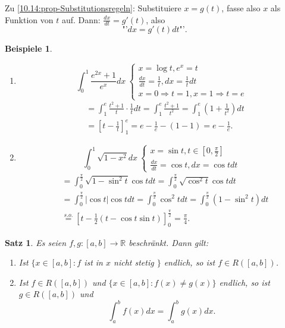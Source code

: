 \documentclass[12pt]{extreport} %
\newcommand{\R}{\mathbb{R}}
\theoremstyle{named}
\theoremstyle{itshape}
\newtheorem{satz}[unnamedtheorem]{Satz}
\theoremstyle{normal}
\newtheorem*{beispiele}{Beispiele}
\begin{document}
{Zu \ref{10.14:prop-Substitutionsregeln}: Substituiere $x = g(t)$, fasse also $x$ als Funktion von $t$ auf. Dann: $\frac{dx}{dt} = g'(t)$, also
	$$ \text{"'} dx = g'(t) dt \text{"'}. $$


\begin{beispiele} ~\
	\begin{enumerate}
		\item $$\int_{0}^{1} \frac{e^{2x} + 1}{e^{x}} dx ~ \begin{cases} x = \log t, e^{x} = t \\ \frac{dx}{dt} = \frac{1}{t}, dx = \frac{1}{t} dt \\ 
		x = 0 \Rightarrow t = 1, x = 1 \Rightarrow t = e \end{cases} $$
			\begin{align*}
				& = \int_{1}^{e} \frac{t^{2} + 1}{t} \cdot \frac{1}{t} dt = \int_{1}^{e} \frac{t^{2} + 1}{t^{2}} = \int_{1}^{e} (1 + \frac{1}{t^{2}}) dt \\
				& = \left[ t - \frac{1}{t} \right]_{1}^{e} = e - \frac{1}{e} - (1 - 1) = e - \frac{
				1}{e}.
			\end{align*}
		\item $$\int_{0}^{1} \sqrt{1 - x^{2}} dx ~ \begin{cases} x = \sin t, t \in [0, \frac{\pi}{2}] \\ \frac{dx}{dt} = \cos t, dx = \cos t dt \end{cases}$$
			\begin{align*}
				& = \int_{0}^{\frac{\pi}{2}} \sqrt{1 - \sin^{2}t} \cos t dt = \int_{0}^{\frac{\pi}{2}} \sqrt{\cos^{2} t} \cos t dt \\
				& = \int_{0}^{\frac{\pi}{2}} |\cos t| \cos t dt = \int_{0}^{\frac{\pi}{2}} \cos^{2} t dt = \int_{0}^{\frac{\pi}{2}} (1 - \sin^{2} t) dt \\
				& \overset{s.o.}{=} \left[ t - \frac{1}{2} (t - \cos t \sin t) \right]_{0}^{\frac{\pi}{2}} = \frac{\pi}{4}.
			\end{align*}
	\end{enumerate}
\end{beispiele}



\begin{satz} \label{10.15:satz}
	Es seien $f, g \colon [a, b] \rightarrow \R$ beschränkt. Dann gilt:
	\begin{enumerate}
		\item Ist $\{ x \in [a, b]: f$ ist in $x$ nicht stetig $\}$ endlich, so ist $f \in R([a, b])$.
		\item Ist $f \in R([a, b])$ und $\{ x \in [a, b] : f(x) \neq g(x) \}$ endlich, so ist $g \in R([a, b])$ und 
			$$ \int_{a}^{b} f(x) dx = \int_{a}^{b} g(x) dx. $$
	\end{enumerate}	
\end{satz}

}
\end{document}
